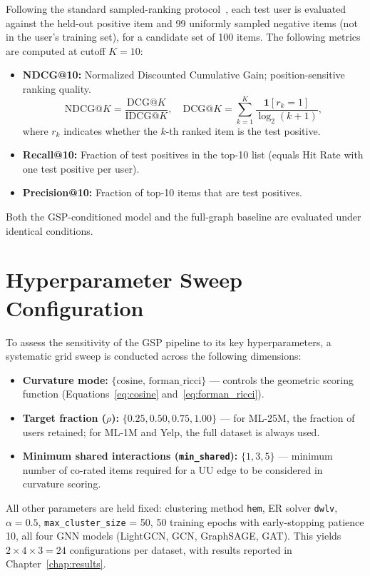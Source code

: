 Following the standard sampled-ranking protocol~\cite{he2020lightgcn}, each test user is evaluated against the held-out positive item and 99 uniformly sampled negative items (not in the user's training set), for a candidate set of 100 items. The following metrics are computed at cutoff $K = 10$:

\begin{itemize}
    \item \textbf{NDCG@10:} Normalized Discounted Cumulative Gain; position-sensitive ranking quality.
    \begin{equation}
        \text{NDCG@}K = \frac{\text{DCG@}K}{\text{IDCG@}K}, \quad \text{DCG@}K = \sum_{k=1}^{K} \frac{\mathbf{1}[r_k = 1]}{\log_2(k+1)},
    \end{equation}
    where $r_k$ indicates whether the $k$-th ranked item is the test positive.
    \item \textbf{Recall@10:} Fraction of test positives in the top-10 list (equals Hit Rate with one test positive per user).
    \item \textbf{Precision@10:} Fraction of top-10 items that are test positives.
\end{itemize}

Both the GSP-conditioned model and the full-graph baseline are evaluated under identical conditions.

\section{Hyperparameter Sweep Configuration}
\label{sec:sweep}

To assess the sensitivity of the GSP pipeline to its key hyperparameters, a systematic grid sweep is conducted across the following dimensions:

\begin{itemize}
    \item \textbf{Curvature mode:} $\{\text{cosine},\, \text{forman\_ricci}\}$ --- controls the geometric scoring function (Equations~\ref{eq:cosine} and~\ref{eq:forman_ricci}).
    \item \textbf{Target fraction ($\rho$):} $\{0.25, 0.50, 0.75, 1.00\}$ --- for ML-25M, the fraction of users retained; for ML-1M and Yelp, the full dataset is always used.
    \item \textbf{Minimum shared interactions (\texttt{min\_shared}):} $\{1, 3, 5\}$ --- minimum number of co-rated items required for a UU edge to be considered in curvature scoring.
\end{itemize}

All other parameters are held fixed: clustering method \texttt{hem}, ER solver \texttt{dwlv}, $\alpha = 0.5$, \texttt{max\_cluster\_size} = 50, 50 training epochs with early-stopping patience 10, all four GNN models (LightGCN, GCN, GraphSAGE, GAT). This yields $2 \times 4 \times 3 = 24$ configurations per dataset, with results reported in Chapter~\ref{chap:results}.

